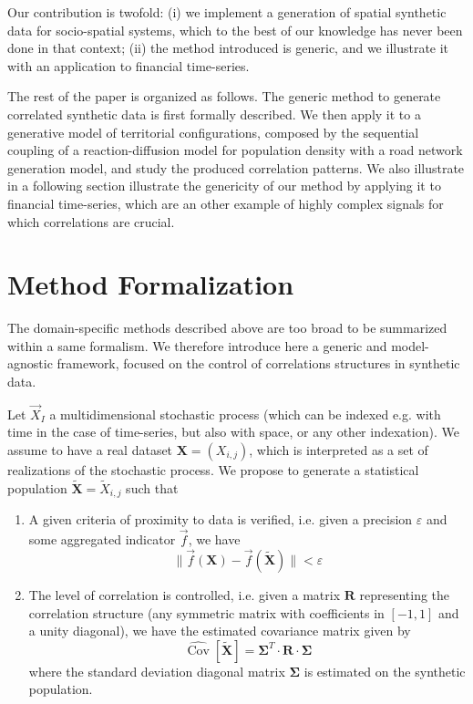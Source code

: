 \documentclass{article}
\DeclareMathOperator{\Cov}{Cov}
\newcommand{\norm}[1]{\| #1 \|}
\begin{document}
Our contribution is twofold: (i) we implement a generation of spatial synthetic data for socio-spatial systems, which to the best of our knowledge has never been done in that context; (ii) the method introduced is generic, and we illustrate it with an application to financial time-series.

The rest of the paper is organized as follows. The generic method to generate correlated synthetic data is first formally described. We then apply it to a generative model of territorial configurations, composed by the sequential coupling of a reaction-diffusion model for population density with a road network generation model, and study the produced correlation patterns. We also illustrate in a following section illustrate the genericity of our method by applying it to financial time-series, which are an other example of highly complex signals for which correlations are crucial.


\section*{Method Formalization}


The domain-specific methods described above are too broad to be summarized within a same formalism. We therefore introduce here a generic and model-agnostic framework, focused on the control of correlations structures in synthetic data.

Let $\vec{X}_I$ a multidimensional stochastic process (which can be indexed e.g. with time in the case of time-series, but also with space, or any other indexation). We assume to have a real dataset $\mathbf{X}=(X_{i,j})$, which is interpreted as a set of realizations of the stochastic process. We propose to generate a statistical population $\mathbf{\tilde{X}}=\tilde{X}_{i,j}$ such that
\begin{enumerate}
\item A given criteria of proximity to data is verified, i.e. given a precision $\varepsilon$ and some aggregated indicator $\vec{f}$, we have 
\begin{equation}
\label{eq:data-proximity}
\norm{\vec{f}(\mathbf{X})- \vec{f}(\mathbf{\tilde{X}})} < \varepsilon
\end{equation}
\item The level of correlation is controlled, i.e. given a matrix $\mathbf{R}$ representing the correlation structure (any symmetric matrix with coefficients in $[-1,1]$ and a unity diagonal), we have the estimated covariance matrix given by
\begin{equation}
\hat{\Cov{}{}}\left[\mathbf{\tilde{X}}\right] = \mathbf{\Sigma}^{T} \cdot \mathbf{R} \cdot \mathbf{\Sigma}
\end{equation}
where the standard deviation diagonal matrix $\mathbf{\Sigma}$ is estimated on the synthetic population.
\end{enumerate}
\end{document}
